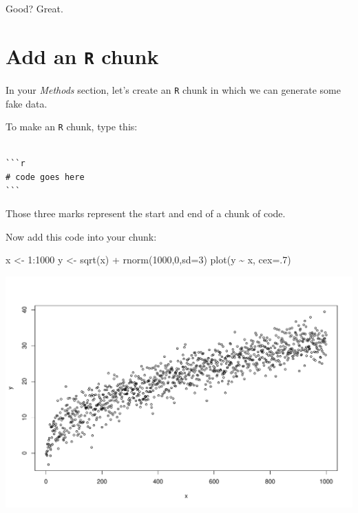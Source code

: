 \documentclass[
]{book}
\newenvironment{Shaded}{\begin{snugshade}}{\end{snugshade}}
\newcommand{\AttributeTok}[1]{\textcolor[rgb]{0.77,0.63,0.00}{#1}}
\newcommand{\DecValTok}[1]{\textcolor[rgb]{0.00,0.00,0.81}{#1}}
\newcommand{\FunctionTok}[1]{\textcolor[rgb]{0.00,0.00,0.00}{#1}}
\newcommand{\NormalTok}[1]{#1}
\newcommand{\OtherTok}[1]{\textcolor[rgb]{0.56,0.35,0.01}{#1}}
\newcommand{\SpecialCharTok}[1]{\textcolor[rgb]{0.00,0.00,0.00}{#1}}
\begin{document}
Good? Great.

\hypertarget{add-an-r-chunk}{%
\section*{\texorpdfstring{Add an \texttt{R} chunk}{Add an R chunk}}\label{add-an-r-chunk}}

In your \emph{Methods} section, let's create an \texttt{R} chunk in which we can generate some fake data.

To make an \texttt{R} chunk, type this:

\begin{verbatim}

```r
# code goes here
```
\end{verbatim}

Those three marks represent the start and end of a chunk of code.

Now add this code into your chunk:

\begin{Shaded}
\begin{Highlighting}[]
\NormalTok{x }\OtherTok{\textless{}{-}} \DecValTok{1}\SpecialCharTok{:}\DecValTok{1000}
\NormalTok{y }\OtherTok{\textless{}{-}} \FunctionTok{sqrt}\NormalTok{(x) }\SpecialCharTok{+} \FunctionTok{rnorm}\NormalTok{(}\DecValTok{1000}\NormalTok{,}\DecValTok{0}\NormalTok{,}\AttributeTok{sd=}\DecValTok{3}\NormalTok{)}
\FunctionTok{plot}\NormalTok{(y }\SpecialCharTok{\textasciitilde{}}\NormalTok{ x, }\AttributeTok{cex=}\NormalTok{.}\DecValTok{7}\NormalTok{)}
\end{Highlighting}
\end{Shaded}

\includegraphics[width=694.08px]{figures/unnamed-chunk-213-1}
\end{document}
